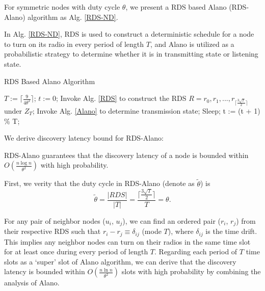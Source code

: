 For symmetric nodes with duty cycle $\theta$, we present a RDS based Alano (RDS-Alano) algorithm as Alg. \ref{RDS-ND}.

In Alg. \ref{RDS-ND}, RDS is used to construct a deterministic
schedule for a node to turn on its radio in every period of length $T$,
and Alano is utilized as a probabilistic strategy to
determine whether it is in transmitting state or listening state.

\begin{algorithm}
\caption{RDS Based Alano Algorithm}
\label{RDS-ND}
\begin{algorithmic}[1]
\STATE $T := \lceil \frac{9}{4\theta^{2}} \rceil$; $t := 0$;
\STATE Invoke Alg. \ref{RDS} to construct the RDS $R = {r_0, r_1, ...,r_{\lceil \frac{3\sqrt{T}}{2}  \rceil}}$ under $Z_T$;
    		\STATE Invoke Alg. \ref{Alano} to determine transmission state;
	\ELSE
    		\STATE Sleep;
	\ENDIF
	\STATE t := (t + 1) \% T;
\ENDWHILE
\end{algorithmic}
\end{algorithm}


We derive discovery latency bound for RDS-Alano:

\begin{theorem}
\label{theoremRDS}
RDS-Alano guarantees that the discovery latency of a node
is bounded within $O(\frac{n\log n}{\theta^2})$ with high probability.
\end{theorem}

\begin{IEEEproof}
First, we verity that the duty cycle in RDS-Alano (denote as $\widetilde{\theta}$) is
$$
\widetilde{\theta} = \frac{|RDS|}{|T|} = \frac{\lceil \frac{3\sqrt{T}}{2}  \rceil}{T} = \theta.
$$

For any pair of neighbor nodes ($u_i$, $u_j$),
we can find an ordered pair ($r_i$, $r_j$) from their respective RDS
such that $r_i - r_j \equiv \delta_{ij}$ (mode $T$), where $\delta_{ij}$ is the time drift.
This implies any neighbor nodes can turn on their radios in the same time slot for at least once during every period of length $T$. 
Regarding each period of $T$ time slots as a `super' slot of Alano algorithm, we can derive that the discovery latency is bounded within $O(\frac{n\ln n}{\theta^2})$ slots with high probability by combining the analysis of Alano.
\end{IEEEproof}

